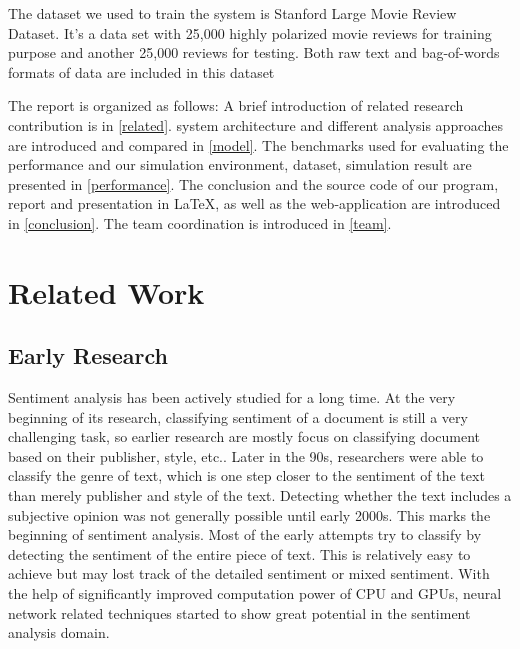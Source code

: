 \documentclass[conference]{IEEEtran}
\begin{document}
    The dataset we used to train the system is Stanford Large Movie Review 
    Dataset\cite{maas2011learning}. It's a data set with 25,000 highly polarized
    movie reviews for training purpose and another 25,000 reviews for testing.
    Both raw text and bag-of-words formats of data are included in this dataset
    
    The report is organized as follows: 
    A brief introduction of related research contribution is in \autoref{related}.
    system architecture and different analysis approaches are introduced and compared 
    in \autoref{model}.
    The benchmarks used for evaluating the performance and our simulation environment, 
    dataset, simulation result are presented in \autoref{performance}.
    The conclusion and the source code of our program, report and 
    presentation in \LaTeX, as well as the web-application are introduced in 
    \autoref{conclusion}.
    The team coordination is introduced in \autoref{team}.
    
\section{Related Work}
\label{related}
\subsection{Early Research}
    Sentiment analysis has been actively studied for a long time. At the very beginning
    of its research, classifying sentiment of a document is still a very challenging
    task, so earlier research are mostly focus on classifying document based on their 
    publisher, style, etc.\cite{biber1991variation}. Later in the 90s, researchers 
    were able to classify the genre 
    of text\cite{karlgren1994recognizing,kessler1997automatic}, 
    which is one step closer to the sentiment of the text
    than merely publisher and style of the text. Detecting whether
    the text includes a subjective opinion was not generally possible until early 
    2000s\cite{hatzivassiloglou2000effects}. This marks the beginning of 
    sentiment analysis. Most of the early attempts try to  classify by detecting 
    the sentiment of the entire piece of text\cite{pang2002thumbs,pang2005seeing}. 
    This is relatively easy to achieve but may lost track of the detailed sentiment
    or mixed sentiment\cite{lu2011multi}.
    With the help of significantly improved
    computation power of CPU and GPUs, neural network related techniques 
    started to show great potential in the sentiment analysis 
    domain\cite{kim2014convolutional,barnes2017assessing}.
\end{document}

